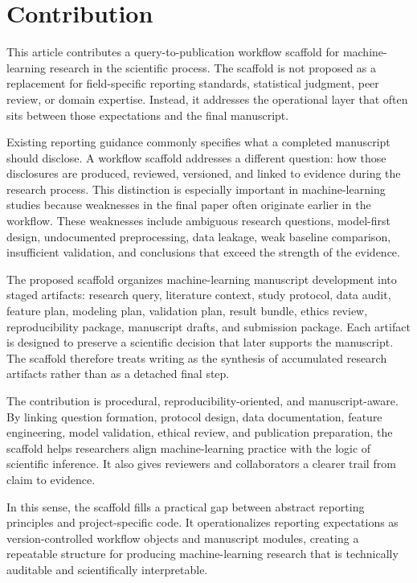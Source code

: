 \section{Contribution}

This article contributes a query-to-publication workflow scaffold for machine-learning research in the scientific process. The scaffold is not proposed as a replacement for field-specific reporting standards, statistical judgment, peer review, or domain expertise. Instead, it addresses the operational layer that often sits between those expectations and the final manuscript.

Existing reporting guidance commonly specifies what a completed manuscript should disclose. A workflow scaffold addresses a different question: how those disclosures are produced, reviewed, versioned, and linked to evidence during the research process. This distinction is especially important in machine-learning studies because weaknesses in the final paper often originate earlier in the workflow. These weaknesses include ambiguous research questions, model-first design, undocumented preprocessing, data leakage, weak baseline comparison, insufficient validation, and conclusions that exceed the strength of the evidence.

The proposed scaffold organizes machine-learning manuscript development into staged artifacts: research query, literature context, study protocol, data audit, feature plan, modeling plan, validation plan, result bundle, ethics review, reproducibility package, manuscript drafts, and submission package. Each artifact is designed to preserve a scientific decision that later supports the manuscript. The scaffold therefore treats writing as the synthesis of accumulated research artifacts rather than as a detached final step.

The contribution is procedural, reproducibility-oriented, and manuscript-aware. By linking question formation, protocol design, data documentation, feature engineering, model validation, ethical review, and publication preparation, the scaffold helps researchers align machine-learning practice with the logic of scientific inference. It also gives reviewers and collaborators a clearer trail from claim to evidence.

In this sense, the scaffold fills a practical gap between abstract reporting principles and project-specific code. It operationalizes reporting expectations as version-controlled workflow objects and manuscript modules, creating a repeatable structure for producing machine-learning research that is technically auditable and scientifically interpretable.
